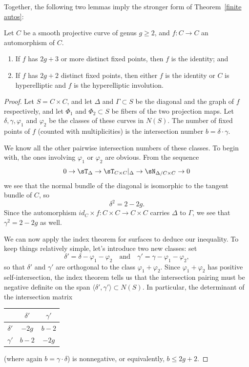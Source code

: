 Together, the following two lemmas imply the stronger form of Theorem~\ref{finite autos}:

\begin{lemma}Let $C$ be a smooth projective curve of genus $g \geq 2$, and $f: C \to C$ an automorphism of $C$.
\begin{enumerate}
\item If $f$ has $2g+3$ or more distinct fixed points, then $f$ is the identity; and
\item If $f$ has $2g+2$ distinct fixed points, then either $f$ is the identity or $C$ is hyperelliptic and $f$ is the hyperelliptic involution.
\end{enumerate}
\end{lemma}

\begin{proof}
Let $S = C\times C$, and let $\Delta$ and $\Gamma \subset S$ be the diagonal and the graph of $f$ respectively, and let $\Phi_1$ and $\Phi_2 \subset S$ be fibers of the two projection maps. Let $\delta, \gamma, \varphi_1$ and $\varphi_2$ be the classes of these curves in  $N(S)$. The number of fixed points of $f$ (counted with multiplicities) is the intersection number  $b = \delta \cdot \gamma$.

We know all the other pairwise intersection numbers of these classes. To begin with, the ones involving $\varphi_1$ or $\varphi_2$ are obvious. From the sequence
$$
0\to \sT_{\Delta} \to \sT_{C\times C}|_{\Delta} \to \sN_{\Delta/C\times C} \to 0
$$
we see that the normal bundle of the diagonal is isomorphic to the tangent bundle of $C$, so
$$
\delta^2 = 2 - 2g.
$$
Since the automorphism $id_C \times f : C\times C \to C \times C$ carries $\Delta$ to $\Gamma$, we see that $\gamma^2 = 2-2g$ as well.

We can now apply the index theorem for surfaces to deduce our inequality. To keep things relatively simple, let's introduce two new classes: set
$$
\delta' = \delta - \varphi_1 - \varphi_2 \quad \text{and} \quad \gamma' = \gamma - \varphi_1 - \varphi_2,
$$
so that $\delta'$ and $\gamma'$ are orthogonal to the class $\varphi_1 + \varphi_2$. Since $\varphi_1 + \varphi_2$ has positive self-intersection, the index theorem  tells us that the intersection pairing must be negative definite on the span $\langle \delta',\gamma' \rangle \subset N(S)$. In particular, the determinant of the intersection matrix
\begin{center}
\begin{tabular}{c|c|c}
& $\delta'$ &  $\gamma'$  \\
\hline
$\delta'$ & $-2g$ & $b-2$ \\
\hline
$\gamma'$ & $b-2$ & $-2g$ 
\end{tabular}
\end{center}
(where again $b = \gamma \cdot \delta$) is nonnegative, or equivalently, $b\leq 2g+2$.
\end{proof}

